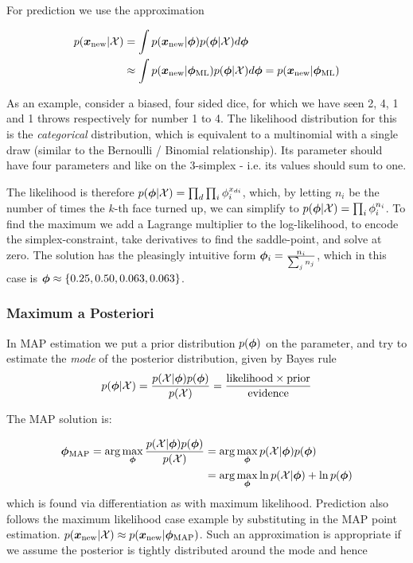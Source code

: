 For prediction we use the approximation

\begin{align*}
p({ \bm x_{\text{new}} } | { \mathcal{X} }) 
&= \int p({ \bm x_{\text{new}} } | { \bm \phi }) p({ \bm \phi } | { \mathcal{X} }) d{ \bm \phi } \\
&\approx \int p({ \bm x_{\text{new}} } | { {{ \bm \phi }}_{\text{ML}} }) p({ \bm \phi } | { \mathcal{X} }) d{ \bm \phi }
=  p({ \bm x_{\text{new}} } | { {{ \bm \phi }}_{\text{ML}} })
\end{align*}

As an example, consider a biased, four sided dice, for which we have seen 2, 4, 1 and 1 throws respectively for number 1 to 4. The likelihood distribution for this is the \emph{categorical} distribution, which is equivalent to a multinomial with a single draw (similar to the Bernoulli / Binomial relationship). Its parameter should have four parameters and like on the 3-simplex - i.e. its values should sum to one. 

The likelihood is therefore $p({ \bm \phi } | { \mathcal{X} }) = \prod_d \prod_i \phi_i^{x_{di}}$, which, by letting $n_i$ be the number of times the $k$-th face turned up, we can simplify to $p({ \bm \phi } | { \mathcal{X} }) = \prod_i \phi_i^{n_i}$. To find the maximum we add a Lagrange multiplier to the log-likelihood, to encode the simplex-constraint, take derivatives to find the saddle-point, and solve at zero. The solution has the pleasingly intuitive form ${ \bm \phi }_i = \frac{n_i}{\sum_j n_j}$, which in this case is ${ \bm \phi } \approx \{0.25, 0.50, 0.063, 0.063\}$. 

\subsubsection*{Maximum a Posteriori}
In MAP estimation we put a prior distribution $p({ \bm \phi })$ on the parameter, and try to estimate the \emph{mode} of the posterior distribution, given by Bayes rule
\begin{align*}
p({ \bm \phi } | { \mathcal{X} }) = \frac{p({ \mathcal{X} } | { \bm \phi })p({ \bm \phi })}{p({ \mathcal{X} })} = \frac{\text{likelihood} \times \text{prior}}{\text{evidence}}
\end{align*}

The MAP solution is:

\begin{align*}
{ { {  \bm \phi  } }_{\text{MAP}} } = \arg \max_{{ \bm \phi }} \frac{p({ \mathcal{X} } | { \bm \phi })p({ \bm \phi })}{p({ \mathcal{X} })}
& = \arg \max_{{ \bm \phi }} p({ \mathcal{X} } | { \bm \phi })p({ \bm \phi }) \\
 & = \arg \max_{ \bm \phi } \ln p({ \mathcal{X} } | { \bm \phi }) + \ln p({ \bm \phi })
\end{align*}
which is found via differentiation as with maximum likelihood. Prediction also follows the maximum likelihood case example by substituting in the MAP point estimation. $p({ \bm x_{\text{new}} } | { \mathcal{X} }) \approx p({ \bm x_{\text{new}} } | { {{ \bm \phi }}_{\text{MAP}} })$. Such an approximation is appropriate if we assume the posterior is tightly distributed around the mode and hence

